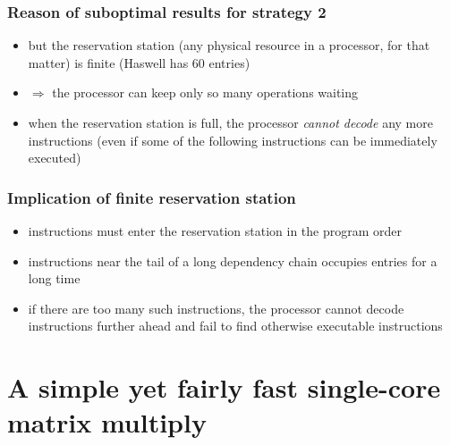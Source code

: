 \documentclass[12pt,dvipdfmx]{beamer}
\newcommand{\aka}[1]{{\color{red}#1}}
\begin{document}
\begin{frame}
\frametitle{Reason of suboptimal results for strategy 2}
\begin{itemize}
\item<1-> but the reservation station (any physical resource in a processor, for that matter) 
  is finite (Haswell has 60 entries) %
\item<2-> $\Rightarrow$ the processor can keep only so many operations waiting 
\item<3-> when the reservation station is full, the processor
  \aka{\em cannot decode} any more instructions 
  (even if some of the following instructions can be immediately executed)
\end{itemize}
\end{frame}

\begin{frame}
\frametitle{Implication of finite reservation station}
\begin{itemize}
\item instructions must enter the reservation station
  in the program order
\item instructions near the tail of a long dependency chain
  occupies entries for a long time
\begin{center}
\def\svgwidth{0.7\textwidth}
{\scriptsize }
\end{center}

\item if there are too many such instructions,
  the processor cannot decode instructions 
  further ahead and fail to find otherwise executable
  instructions
\end{itemize}
\end{frame}
\fi


\fi

\section{A simple yet fairly fast single-core matrix multiply}
\end{document}
